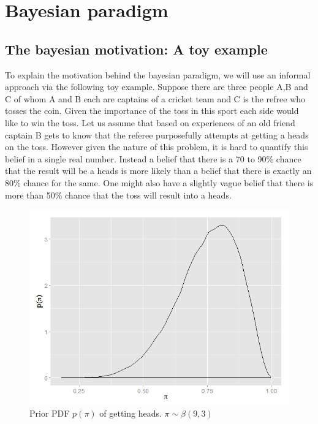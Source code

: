 
\chapter{Bayesian paradigm}
\label{ch : bayesian_paradigm}

\section{The bayesian motivation: A toy example}
To explain the motivation behind the bayesian paradigm, we will use an informal approach via the following toy example. Suppose there are three people A,B and C of whom A and B each are captains of a cricket team and C is the refree who tosses the coin. Given the importance of the toss in this sport each side would like to win the toss. Let us assume that based on experiences of an old friend captain B gets to know that the referee purposefully attempts at getting a heads on the toss. However given the nature of this problem, it is hard to quantify this belief in a single real number. Instead a belief that there is a 70 to 90\% chance that the result will be a heads is more likely than a belief that there is exactly an 80\% chance for the same. One might also have a slightly vague belief that there is more than 50\% chance that the toss will result into a heads. \\

\begin{figure}
	\centering
	\includegraphics[scale=0.5]{mainmatter/chapter_2_bayesian_paradigm/toy_problem_pdf.png}
	\caption{Prior PDF $p(\pi)$ of getting heads. $\pi \sim \beta(9,3)$}
	\label{fig : toy_problem_pdf}
\end{figure}


